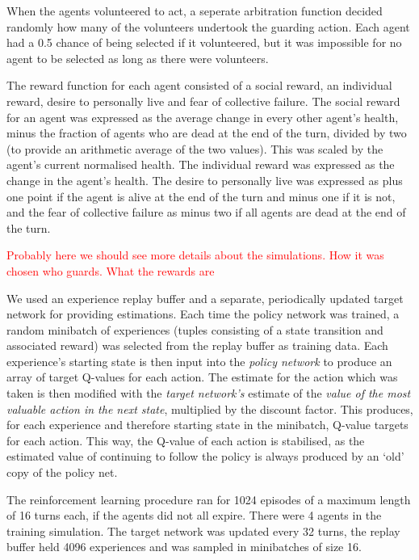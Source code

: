 When the agents volunteered to act, a seperate arbitration function decided
randomly how many of the volunteers undertook the guarding action. Each agent
had a 0.5 chance of being selected if it volunteered, but it was impossible for
no agent to be selected as long as there were volunteers.

The reward function for each agent consisted of a social reward, an individual
reward, desire to personally live and fear of collective failure. The social
reward for an agent was expressed as the average change in every other agent's
health, minus the fraction of agents who are dead at the end of the turn,
divided by two (to provide an arithmetic average of the two values). This was
scaled by the agent's current normalised health. The individual reward was
expressed as the change in the agent's health. The desire to personally live
was expressed as plus one point if the agent is alive at the end of the turn
and minus one if it is not, and the fear of collective failure as minus two if
all agents are dead at the end of the turn. 

\textcolor{red}{Probably here we should see more details about the simulations. How it was chosen who guards. What the rewards are}

We used an experience replay buffer and a separate, periodically updated target
network for providing estimations.
%
Each time the policy network was trained, a random minibatch of experiences
(tuples consisting of a state transition and associated reward) was selected
from the replay buffer as training data.
%
Each experience's starting state is then input into the \emph{policy network}
to produce an array of target Q-values for each action. The estimate for
the action which was taken is then modified with the \emph{target network's}
estimate of the \emph{value of the most valuable action in the next state},
multiplied by the discount factor. This produces, for each experience and
therefore starting state in the minibatch, Q-value targets for each action.
%
This way, the Q-value of each action is stabilised, as the estimated value of
continuing to follow the policy is always produced by an `old' copy of the
policy net.

The reinforcement learning procedure ran for 1024 episodes of a maximum length
of 16 turns each, if the agents did not all expire. There were 4 agents in the
training simulation. The target network was updated every 32 turns, the replay
buffer held 4096 experiences and was sampled in minibatches of size 16.

